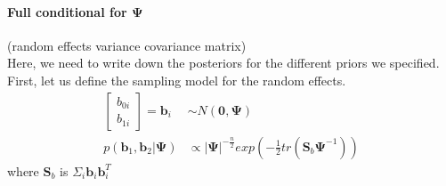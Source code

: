 \documentclass[a4paper]{article}
\begin{document}
\paragraph{Full conditional for $\bm{\Psi}$}(random effects variance covariance matrix)\\

Here, we need to write down the posteriors for the different priors we specified. First, let us define the sampling model for the random effects.
 \begin{equation}
  \begin{split} 
   \begin{bmatrix} 
	   b_{0i}\\ 
	   b_{1i}
   \end{bmatrix} 
  	= \bm{b}_{i}& \sim N(\bm{0}, \bm{\Psi}) \\
 	p(\bm{b}_{1}, \bm{b}_{2}| \bm{\Psi})& \propto |\bm{\Psi}|^{-\frac{n}{2}} exp\left(-\frac{1}{2}tr(\bm{S}_b\bm{\Psi}^{-1})\right)  
  \end{split} 
 \end{equation}
where $\bm{S}_b$ is $\Sigma_i\bm{b}_i\bm{b}_i^{T}$
\end{document}
